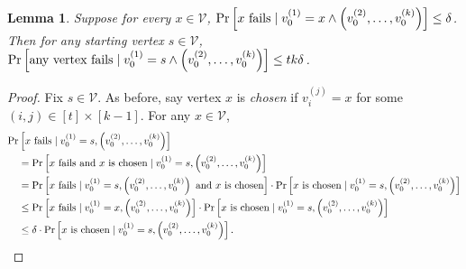 \documentclass[10]{article}
\newtheorem{lemma}[theorem]{Lemma}
\begin{document}
\begin{lemma} \label{lem:rw:startbound}
Suppose for every $x \in \mathcal{V}$, $\Pr \left [\textnormal{$x$ fails} \mid v_0^{(1)} = x \wedge \left (v_0^{(2)}, \dots, v_0^{(k)} \right ) \right ] \leq \delta$.
Then for any starting vertex $s \in \mathcal{V}$, $\Pr \left [\textnormal{any vertex fails} \mid v_0^{(1)} = s \wedge \left (v_0^{(2)}, \dots, v_0^{(k)} \right ) \right ] \leq tk\delta$.
\end{lemma}
%
\begin{proof}
Fix $s \in \mathcal{V}$.
As before, say vertex $x$ is \emph{chosen} if $v_i^{(j)} = x$ for some $(i, j) \in [t] \times [k-1]$.
For any $x \in \mathcal{V}$, 
%
\begin{align}
\nonumber
\Pr& \left [ \textnormal{$x$ fails} \mid v_0^{(1)} = s, \left (v_0^{(2)}, \dots, v_0^{(k)} \right ) \right ]
\\
\nonumber
&=
\Pr \left [ \textnormal{$x$ fails and $x$ is chosen} \mid v_0^{(1)} = s, \left (v_0^{(2)}, \dots, v_0^{(k)} \right ) \right ]
\\
\nonumber
&=
\Pr \left [ \textnormal{$x$ fails} \mid v_0^{(1)} = s, \left (v_0^{(2)}, \dots, v_0^{(k)} \right ) \textnormal{ and $x$ is chosen} \right ] \cdot
\Pr \left [ \textnormal{$x$ is chosen} \mid v_0^{(1)} = s, \left (v_0^{(2)}, \dots, v_0^{(k)} \right ) \right ]
\\
\nonumber
&\leq
\Pr \left [ \textnormal{$x$ fails} \mid v_0^{(1)} = x, \left (v_0^{(2)}, \dots, v_0^{(k)} \right ) \right ] \cdot
\Pr \left [ \textnormal{$x$ is chosen} \mid v_0^{(1)} = s, \left (v_0^{(2)}, \dots, v_0^{(k)} \right ) \right ]
\\
\label{eq:rw:sample:fail:prob}
&\leq
\delta \cdot
\Pr \left [ \textnormal{$x$ is chosen} \mid v_0^{(1)} = s, \left (v_0^{(2)}, \dots, v_0^{(k)} \right ) \right ].
\end{align}
%


\end{proof}
\end{document}
